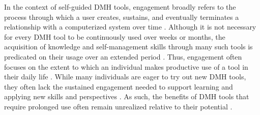 In the context of self-guided DMH tools, engagement broadly refers to the process through which a user creates, sustains, and eventually terminates a relationship with a computerized system over time \cite{sidner2004look, xu2013designing, doherty2018engagement}. Although it is not necessary for every DMH tool to be continuously used over weeks or months, the acquisition of knowledge and self-management skills through many such tools is predicated on their usage over an extended period \cite{scholten2019use, pendse2022treatment}. Thus, engagement often focuses on the extent to which an individual makes productive use of a tool in their daily life \cite{schueller2017integrating, zech2023integrative}. While many individuals are eager to try out new DMH tools, they often lack the sustained engagement needed to support learning and applying new skills and perspectives \cite{muench2017more, lipschitz2023engagement}. As such, the benefits of DMH tools that require prolonged use often remain unrealized relative to their potential \cite{figueroa2022daily, bhattacharjee2023integrating}. 

